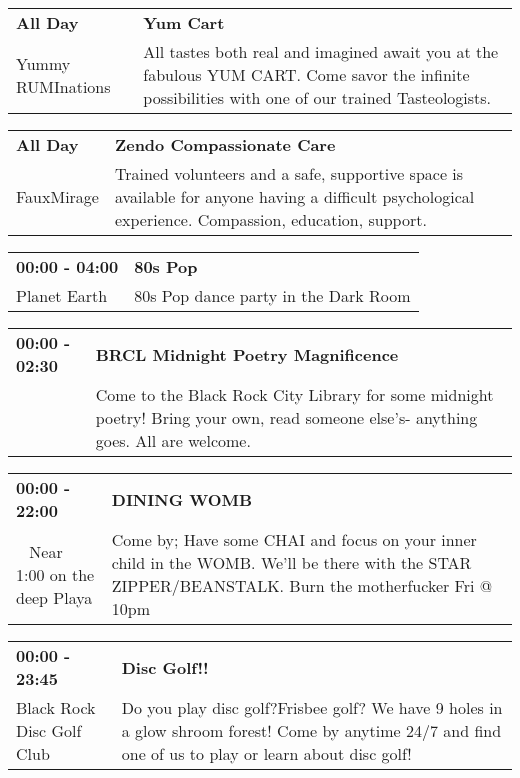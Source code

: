 \begin{tabular}{ p{1in} p{2.2in} }
    \textbf{All Day} & \textbf{Yum Cart} \\
    Yummy RUMInations \newline  & All tastes both real and imagined await you at the fabulous YUM CART. Come savor the infinite possibilities with one of our trained Tasteologists. \\
    \hline 
\end{tabular}
    
\begin{tabular}{ p{1in} p{2.2in} }
    \textbf{All Day} & \textbf{Zendo Compassionate Care } \\
    FauxMirage \newline  & Trained volunteers and a safe, supportive space is available for anyone having a difficult psychological experience. Compassion, education, support. \\
    \hline 
\end{tabular}
    
\begin{tabular}{ p{1in} p{2.2in} }
    \textbf{00:00 - 04:00} & \textbf{80s Pop} \\
    Planet Earth \newline  & 80s Pop dance party in the Dark Room \\
    \hline 
\end{tabular}
    
\begin{tabular}{ p{1in} p{2.2in} }
    \textbf{00:00 - 02:30} & \textbf{BRCL Midnight Poetry Magnificence} \\
    ~ \newline  & Come to the Black Rock City Library for some midnight poetry! Bring your own, read someone else's- anything goes.  All are welcome. \\
    \hline 
\end{tabular}
    
\begin{tabular}{ p{1in} p{2.2in} }
    \textbf{00:00 - 22:00} & \textbf{DINING WOMB} \\
    ~ \newline Near 1:00 on the deep Playa & Come by; Have some CHAI and focus on your inner child in the WOMB.  We'll be there with the STAR ZIPPER/BEANSTALK.  Burn the motherfucker Fri @ 10pm \\
    \hline 
\end{tabular}
    
\begin{tabular}{ p{1in} p{2.2in} }
    \textbf{00:00 - 23:45} & \textbf{Disc Golf!!} \\
    Black Rock Disc Golf Club \newline  & Do you play disc golf?Frisbee golf? We have 9 holes in a glow shroom forest! Come by anytime 24/7 and find one of us to play or learn about disc golf! \\
    \hline 
\end{tabular}
    
